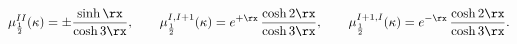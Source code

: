 \begin{equation}
\mu_{\frac12}^{II}(\kappa)=\pm\frac{\sinh \rx}{\cosh 3\rx},
\qquad
\mu_{\frac12}^{I,I+1}(\kappa)=
e^{+\rx}\,
\frac{\cosh 2\rx}{\cosh 3\rx},
\qquad
\mu_{\frac12}^{I+1,I}(\kappa)=e^{-\rx}\,
\frac{\cosh 2\rx}{\cosh 3\rx}.
\label{M1/2}
\end{equation}

